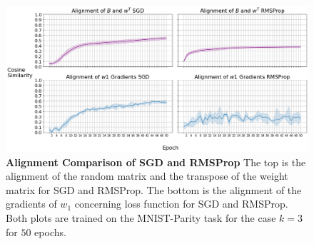 \documentclass[a4paper, nobind]{templates/ociamthesis}
\begin{document}
\begin{figure}

{\centering \includegraphics[width=1\linewidth]{figures/3_k3_SGD_RMSProp_DFA_Alingment} 

}

\caption[Alignment Comparison of SGD and RMSProp]{\textbf{Alignment Comparison of SGD and RMSProp} \newline The top is the alignment of the random matrix and the transpose of the weight matrix for SGD and RMSProp. The bottom is the alignment of the gradients of $w_1$ concerning loss function for SGD and RMSProp. Both plots are trained on the MNIST-Parity task for the case $k=3$ for $50$ epochs.}\label{fig:Alignment}
\end{figure}
\end{document}
